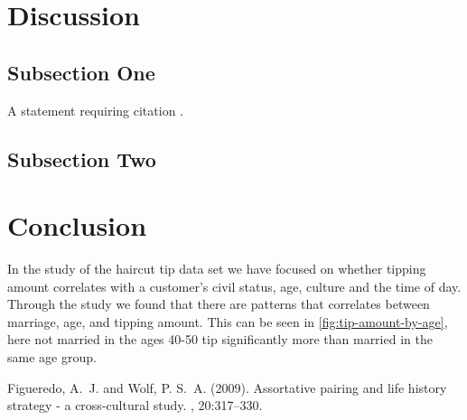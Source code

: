 \documentclass[twoside,twocolumn]{article}
\begin{document}

\section{Discussion}

\subsection{Subsection One}

A statement requiring citation \cite{Figueredo:2009dg}.

\subsection{Subsection Two}


\section{Conclusion}
In the study of the haircut tip data set we have focused on whether tipping amount correlates with a customer's civil status, age, culture and the time of day. Through the study we found that there are patterns that correlates between marriage, age, and tipping amount. This can be seen in \figurename{\ref{fig:tip-amount-by-age}}, here not married in the ages 40-50 tip significantly more than married in the same age group.


\begin{thebibliography}{99} %

Figueredo, A.~J. and Wolf, P. S.~A. (2009).
\newblock Assortative pairing and life history strategy - a cross-cultural
  study.
, 20:317--330.

\end{thebibliography}

\end{document}
